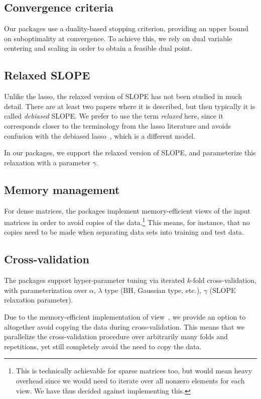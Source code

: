 \documentclass[article]{jss}
\let\Cref\crtCref
\begin{document}
\subsection{Convergence criteria}

Our packages use a duality-based stopping criterion, providing an upper
bound on suboptimality at convergence. To achieve this, we rely
on dual variable centering and scaling in order to obtain a feasible dual
point.

\subsection{Relaxed SLOPE}

Unlike the lasso, the relaxed version of SLOPE has not been studied in much detail.
There are at least two papers where it is described, but then typically it is
called \emph{debiased} SLOPE. We prefer to use the term \emph{relaxed} here,
since it corresponds closer to the terminology from the lasso literature and
avoids confusion with the debiased lasso~\citep{geer2014}, which is a different
model.

In our packages, we support the relaxed version of SLOPE, and parameterize
this relaxation with a parameter \(\gamma\).

\subsection{Memory management}
\label{sec:memory-management}

For dense matrices, the packages implement memory-efficient views of
the input matrices in order to avoid copies of the data.\footnote{This is technically achievable for sparse matrices too, but
  would mean heavy overhead since we would need to iterate over all nonzero
  elements for each view. We have thus decided against implementing this.}
This means, for instance, that no copies need to be made when separating
data sets into training and test data.

\subsection{Cross-validation}

The packages support hyper-parameter tuning via iterated \(k\)-fold
cross-validation, with parameterization over \(\alpha\), \(\lambda\) type (BH,
Gaussian type, etc.), \(\gamma\) (SLOPE relaxation parameter).

Due to the memory-efficient implementation of view~\Cref{sec:memory-management}, we provide
an option to altogether avoid copying the data during cross-validation.
This means that we parallelize the cross-validation procedure over
arbitrarily many folds and repetitions, yet still completely
avoid the need to copy the data.
\end{document}
